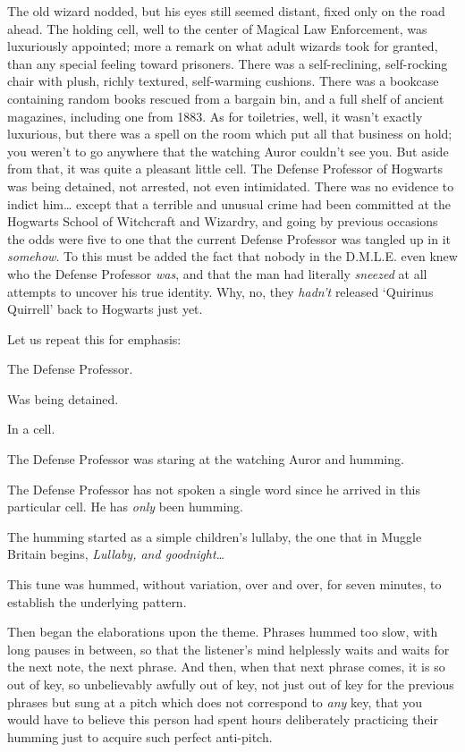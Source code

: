 The old wizard nodded, but his eyes still seemed distant, fixed only on the 
road ahead.
\sbreak
The holding cell, well to the center of Magical Law Enforcement, was 
luxuriously appointed; more a remark on what adult wizards took for granted, 
than any special feeling toward prisoners. There was a self-reclining, 
self-rocking chair with plush, richly textured, self-warming cushions. There 
was a bookcase containing random books rescued from a bargain bin, and a full 
shelf of ancient magazines, including one from 1883. As for toiletries, well, 
it wasn't exactly luxurious, but there was a spell on the room which put all 
that business on hold; you weren't to go anywhere that the watching Auror 
couldn't see you. But aside from that, it was quite a pleasant little cell. The 
Defense Professor of Hogwarts was being detained, not arrested, not even 
intimidated. There was no evidence to indict him{\ldots} except that a terrible 
and unusual crime had been committed at the Hogwarts School of Witchcraft and 
Wizardry, and going by previous occasions the odds were five to one that the 
current Defense Professor was tangled up in it \emph{somehow}. To this must be 
added the fact that nobody in the D.M.L.E. even knew who the Defense Professor 
\emph{was}, and that the man had literally \emph{sneezed} at all attempts to 
uncover his true identity. Why, no, they \emph{hadn't} released `Quirinus 
Quirrell' back to Hogwarts just yet.

Let us repeat this for emphasis:

The Defense Professor.

Was being detained.

In a cell.

The Defense Professor was staring at the watching Auror and humming.

The Defense Professor has not spoken a single word since he arrived in this 
particular cell. He has \emph{only} been humming.

The humming started as a simple children's lullaby, the one that in Muggle 
Britain begins, \emph{Lullaby, and goodnight{\ldots}}

This tune was hummed, without variation, over and over, for seven minutes, to 
establish the underlying pattern.

Then began the elaborations upon the theme. Phrases hummed too slow, with long 
pauses in between, so that the listener's mind helplessly waits and waits for 
the next note, the next phrase. And then, when that next phrase comes, it is so 
out of key, so unbelievably awfully out of key, not just out of key for the 
previous phrases but sung at a pitch which does not correspond to \emph{any} 
key, that you would have to believe this person had spent hours deliberately 
practicing their humming just to acquire such perfect anti-pitch.

